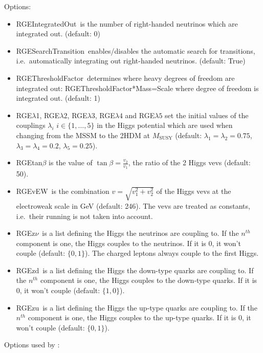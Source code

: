\documentclass[10pt,a4paper,twoside]{scrartcl}
\begin{document}
Options:
\begin{itemize}
\item RGEIntegratedOut\ is the number of right-handed neutrinos which are
  integrated out. (default: 0)
\item RGESearchTransition\ enables/disables the automatic search for
  transitions, i.e.\ automatically integrating out right-handed
neutrinos. (default: True)
\item RGEThresholdFactor\ determines where heavy degrees of freedom are integrated
  out: RGEThresholdFactor*Mass=Scale where degree of freedom is integrated
  out. (default: 1)
\item RGE$\lambda$1, RGE$\lambda2$, RGE$\lambda3$, RGE$\lambda4$ and RGE$\lambda5$
  set the initial values of the couplings $\lambda_i$
  $i\in\{1,\dots,5\}$ in the Higgs potential which are used when
  changing from the MSSM to the 2HDM at $M_\mathrm{SUSY}$
  (default: $\lambda_1=\lambda_2=0.75$, $\lambda_3=\lambda_4=0.2$, $\lambda_5=0.25$).
\item RGEtan$\beta$ is the value of $\tan\beta=\frac{v_2}{v_1}$, the ratio of the 2
  Higgs vevs (default: 50).
\item RGEvEW\ is the combination $v=\sqrt{v_1^2+v_2^2}$ of the Higgs vevs at the
  electroweak scale in GeV (default: 246).  The vevs are treated as
  constants, i.e.\ their running is not taken into account.
\item RGEz$\nu$\ is a list defining the Higgs the neutrinos are coupling to. If the $n^{th}$ component is one,
    the Higgs couples to the neutrinos. If it is 0, it won't
    couple (default: $\{0,1\}$). The charged leptons always couple to the
  first Higgs.
\item RGEzd\ is a list defining the Higgs the down-type quarks are coupling to. If the $n^{th}$ component is one,
    the Higgs couples to the down-type quarks. If it is 0, it won't
    couple (default: $\{1,0\}$).
\item RGEzu\ is a list defining the Higgs the up-type quarks are coupling to. If the $n^{th}$ component is one,
    the Higgs couples to the up-type quarks. If it is 0, it won't
    couple (default: $\{0,1\}$).

\end{itemize}

Options used by :
\end{document}
